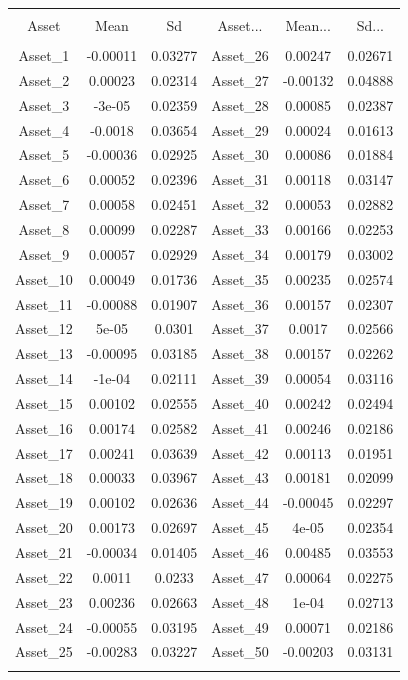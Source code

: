 \documentclass[11pt,preprint, authoryear]{elsarticle}
\let\origtable\table
\let\endorigtable\endtable
\renewenvironment{table}[1][2] {
    \expandafter\origtable\expandafter[H]
} {
    \endorigtable
}
\numberwithin{equation}{section}
\numberwithin{figure}{section}
\numberwithin{table}{section}
\begin{document}
\begin{table}[!htbp] \centering 
  \caption{Asset Means and Sd's} 
  \label{msd} 
\begin{tabular}{@{\extracolsep{5pt}} cccccc} 
\\[-1.8ex]\hline 
\hline \\[-1.8ex] 
Asset & Mean & Sd & Asset... & Mean... & Sd... \\ 
\hline \\[-1.8ex] 
Asset\_1 & -0.00011 & 0.03277 & Asset\_26 & 0.00247 & 0.02671 \\ 
Asset\_2 & 0.00023 & 0.02314 & Asset\_27 & -0.00132 & 0.04888 \\ 
Asset\_3 & -3e-05 & 0.02359 & Asset\_28 & 0.00085 & 0.02387 \\ 
Asset\_4 & -0.0018 & 0.03654 & Asset\_29 & 0.00024 & 0.01613 \\ 
Asset\_5 & -0.00036 & 0.02925 & Asset\_30 & 0.00086 & 0.01884 \\ 
Asset\_6 & 0.00052 & 0.02396 & Asset\_31 & 0.00118 & 0.03147 \\ 
Asset\_7 & 0.00058 & 0.02451 & Asset\_32 & 0.00053 & 0.02882 \\ 
Asset\_8 & 0.00099 & 0.02287 & Asset\_33 & 0.00166 & 0.02253 \\ 
Asset\_9 & 0.00057 & 0.02929 & Asset\_34 & 0.00179 & 0.03002 \\ 
Asset\_10 & 0.00049 & 0.01736 & Asset\_35 & 0.00235 & 0.02574 \\ 
Asset\_11 & -0.00088 & 0.01907 & Asset\_36 & 0.00157 & 0.02307 \\ 
Asset\_12 & 5e-05 & 0.0301 & Asset\_37 & 0.0017 & 0.02566 \\ 
Asset\_13 & -0.00095 & 0.03185 & Asset\_38 & 0.00157 & 0.02262 \\ 
Asset\_14 & -1e-04 & 0.02111 & Asset\_39 & 0.00054 & 0.03116 \\ 
Asset\_15 & 0.00102 & 0.02555 & Asset\_40 & 0.00242 & 0.02494 \\ 
Asset\_16 & 0.00174 & 0.02582 & Asset\_41 & 0.00246 & 0.02186 \\ 
Asset\_17 & 0.00241 & 0.03639 & Asset\_42 & 0.00113 & 0.01951 \\ 
Asset\_18 & 0.00033 & 0.03967 & Asset\_43 & 0.00181 & 0.02099 \\ 
Asset\_19 & 0.00102 & 0.02636 & Asset\_44 & -0.00045 & 0.02297 \\ 
Asset\_20 & 0.00173 & 0.02697 & Asset\_45 & 4e-05 & 0.02354 \\ 
Asset\_21 & -0.00034 & 0.01405 & Asset\_46 & 0.00485 & 0.03553 \\ 
Asset\_22 & 0.0011 & 0.0233 & Asset\_47 & 0.00064 & 0.02275 \\ 
Asset\_23 & 0.00236 & 0.02663 & Asset\_48 & 1e-04 & 0.02713 \\ 
Asset\_24 & -0.00055 & 0.03195 & Asset\_49 & 0.00071 & 0.02186 \\ 
Asset\_25 & -0.00283 & 0.03227 & Asset\_50 & -0.00203 & 0.03131 \\ 
\hline \\[-1.8ex] 
\end{tabular} 
\end{table}
\end{document}
